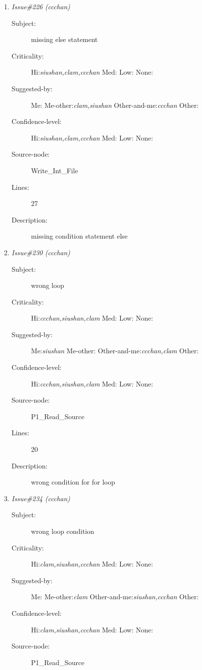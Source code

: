 \begin{enumerate}
\begin{description}
\item [Lines:] 54-55

\item [Description:] searching has to be set to false
\end{description}
\item {\it Issue\#226 (ccchan)}
\begin{description}
\item [Subject:] missing else statement
\item [Criticality:] Hi:{\it siushan,clam,ccchan} Med:{\it } Low:{\it } None:{\it }
\item [Suggested-by:] Me:{\it } Me-other:{\it clam,siushan} Other-and-me:{\it ccchan} Other:{\it }
\item [Confidence-level:] Hi:{\it siushan,clam,ccchan} Med:{\it } Low:{\it } None:{\it }
\item [Source-node:] Write\_Int\_File

\item [Lines:] 27

\item [Description:] missing condition statement else
\end{description}
\item {\it Issue\#230 (ccchan)}
\begin{description}
\item [Subject:] wrong loop
\item [Criticality:] Hi:{\it ccchan,siushan,clam} Med:{\it } Low:{\it } None:{\it }
\item [Suggested-by:] Me:{\it siushan} Me-other:{\it } Other-and-me:{\it ccchan,clam} Other:{\it }
\item [Confidence-level:] Hi:{\it ccchan,siushan,clam} Med:{\it } Low:{\it } None:{\it }
\item [Source-node:] P1\_Read\_Source

\item [Lines:] 20

\item [Description:] wrong condition for for loop
\end{description}
\item {\it Issue\#234 (ccchan)}
\begin{description}
\item [Subject:] wrong loop condition
\item [Criticality:] Hi:{\it clam,siushan,ccchan} Med:{\it } Low:{\it } None:{\it }
\item [Suggested-by:] Me:{\it } Me-other:{\it clam} Other-and-me:{\it siushan,ccchan} Other:{\it }
\item [Confidence-level:] Hi:{\it clam,siushan,ccchan} Med:{\it } Low:{\it } None:{\it }
\item [Source-node:] P1\_Read\_Source


\end{description}
\end{enumerate}
